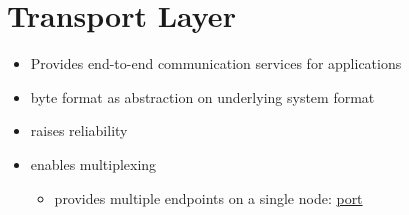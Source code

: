 \documentclass{report}
\begin{document}
\section{Transport Layer}
\begin{itemize}
  \item Provides end-to-end communication services for applications
  \item byte format as abstraction on underlying system format
  \item raises reliability
  \item enables multiplexing
    \begin{itemize}[label=$\circ$]
      \item provides multiple endpoints on a single node: \underline{port}
    \end{itemize}
\end{itemize}
\end{document}
